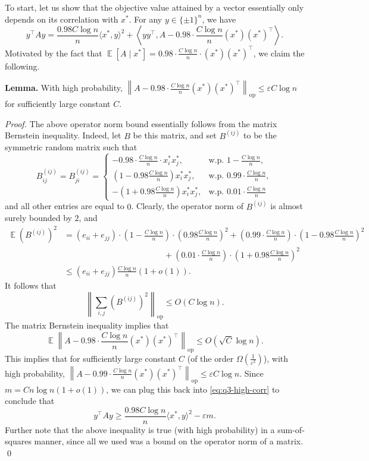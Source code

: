 \documentclass[11pt]{article}
\theoremstyle{definition}
\renewcommand{\epsilon}{\varepsilon}
\newcommand{\eps}{\epsilon}
\DeclareMathOperator{\E}{\mathbb{E}} %
\newcommand{\opnorm}[1]{\left\|#1\right\|_{\mathrm{op}}}
\begin{document}
\begin{enumerate}[label=(\alph*)]
    To start, let us show that the objective value attained by a vector essentially only depends on its correlation with $x^*$. For any $y \in \{\pm 1\}^n$, we have
    \[ y^\top A y = \frac{0.98 C \log n}{n} \langle x^*,y\rangle^2 + \left\langle yy^\top , A - 0.98 \cdot \frac{C \log n}{n} (x^*)(x^*)^\top \right\rangle. \]
    Motivated by the fact that $\E[A \mid x^*] = 0.98 \cdot \frac{C \log n}{n} \cdot (x^*)(x^*)^\top$, we claim the following.

    \textbf{Lemma.} With high probability, $\opnorm{ A - 0.98 \cdot \frac{C \log n}{n} (x^*)(x^*)^\top } \le \eps C\log n$ for sufficiently large constant $C$.
    
    \emph{Proof.} The above operator norm bound essentially follows from the matrix Bernstein inequality. Indeed, let $B$ be this matrix, and set $B^{(ij)}$ to be the symmetric random matrix such that
    \[ B^{(ij)}_{ij} = B^{(ij)}_{ji} = \begin{cases} - 0.98 \cdot \frac{C \log n}{n} \cdot x_i^* x_j^*, & \text{w.p. } 1 - \frac{C \log n}{n}, \\ \left( 1 - 0.98 \frac{C \log n}{n} \right) x_i^* x_j^*, & \text{w.p. } 0.99 \cdot \frac{C \log n}{n}, \\ - \left( 1 + 0.98 \frac{C \log n}{n} \right) x_i^* x_j^*, & \text{w.p. } 0.01 \cdot \frac{C \log n}{n} \end{cases} \]
    and all other entries are equal to $0$. Clearly, the operator norm of $B^{(ij)}$ is almost surely bounded by $2$, and
    \begin{align*}
      \E (B^{(ij)})^2 &= (e_{ii} + e_{jj}) \cdot \left( 1 - \frac{C \log n}{n} \right) \cdot \left( 0.98 \frac{C \log n}{n} \right)^2 + \left( 0.99 \cdot \frac{C \log n}{n} \right) \cdot \left( 1 - 0.98 \frac{C \log n}{n} \right)^2 \\
      &\qquad\qquad\qquad\qquad\qquad\qquad+ \left( 0.01 \cdot \frac{C \log n}{n} \right) \cdot \left( 1 + 0.98 \frac{C \log n}{n} \right)^2 \\
        &\le (e_{ii} + e_{jj}) \frac{C \log n}{n} \left( 1 + o(1) \right).
    \end{align*}
    It follows that
    \[ \opnorm{ \sum_{i,j} (B^{(ij)})^2 } \le O(C \log n). \]
    The matrix Bernstein inequality implies that
    \[ \E \opnorm{ A - 0.98 \cdot \frac{C \log n}{n} (x^*)(x^*)^\top } \le O\left( \sqrt{C} \log n \right). \]
    This implies that for sufficiently large constant $C$ (of the order $\Omega\left(\frac{1}{\eps^2}\right)$), with high probability, $\opnorm{ A - 0.99 \cdot \frac{C \log n}{n} (x^*)(x^*)^\top } \le \eps C \log n$. Since $m = C n \log n (1+o(1))$, we can plug this back into \eqref{eq:q3-high-corr} to conclude that
    \begin{equation}
      \label{q3:eq-main}
      y^\top A y \ge \frac{0.98 C \log n}{n} \langle x^*,y\rangle^2 - \eps m.
    \end{equation}
    Further note that the above inequality is true (with high probability) in a sum-of-squares manner, since all we used was a bound on the operator norm of a matrix. \qed\qedhere


\end{enumerate}
\end{document}
